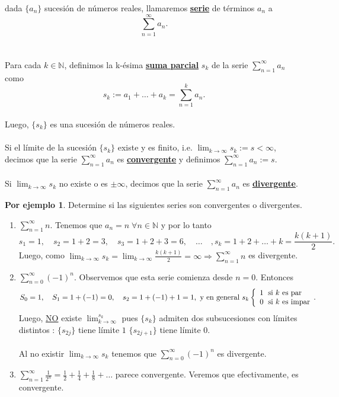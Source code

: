 \documentclass{article}
\theoremstyle{definition}
\theoremstyle{definition}
\newtheorem*{ej}{Por ejemplo}
\theoremstyle{remark}
\begin{document}
\begin{defi}
  dada $ \{ a_n \} $ sucesión de números reales, llamaremos \textbf{\underline{serie}} de términos $a_n$ a $$\sum_{n=1}^{\infty}{a_n}.$$ \\\\
 Para cada $k \in \mathbb{N}$, definimos la k-ésima \textbf{\underline{suma parcial}} $s_k$ de la serie $\sum_{n=1}^{\infty}{a_n}$ como $$s_k:=a_1 + \dots + a_k = \sum_{n=1}^{k}{a_n}.$$ \\
 Luego, $\{s_k\}$ es una sucesión de números reales.\\\\ Si el límite de la sucesión $\{s_k\}$ existe y es finito, i.e. $\lim_{k \to \infty}{s_k}:=s<\infty$, decimos que la serie $\sum_{n=1}^{\infty}{a_n}$ es \textbf{\underline{convergente}} y definimos $\sum_{n=1}^{\infty}{a_n}:=s$. \\\\
 Si $\lim_{k \to \infty}{s_k}$ no existe o es $\pm \infty$, decimos que la serie $\sum_{n=1}^{\infty}{a_n}$ es \textbf{\underline{divergente}}.


\end{defi}

\pagebreak
\begin{ej}
  Determine si las siguientes series son convergentes o divergentes. \\
  \begin{enumerate}
    \item $\sum_{n=1}^{\infty}{n}.$ \quad Tenemos que $a_n=n\; \forall n \in \mathbb{N}$ y por lo tanto \[ 
        s_1=1, \quad s_2=1+2=3, \quad s_3=1+2+3=6, \quad \dots \quad ,s_k=1+2+\dots + k= \frac{k(k+1)}{2} .
      \] 
      Luego, como $\lim_{k \to \infty}{s_k}=\lim_{k \to \infty}{\frac{k(k+1)}{2}}=\infty \Rightarrow \sum_{n=1}^{\infty}{n}$ es divergente.
    \item $\sum_{n=0}^{\infty}{(-1)^n}$. Observemos que esta serie comienza desde $n=0$. Entonces \[ 
        S_0=1, \quad S_1=1 + (-1) = 0, \quad s_2=1+(-1)+1=1, \text{ y en general } s_k \left\{ \begin{array}{l}
            1 \; $\text{ si $k$ es par}$  \\
0 \; $\text{ si $k$ es impar}$  
        \end{array}.\right.
      \]
      Luego, \underline{NO} existe $\lim_{k\to \infty}^{s_k}$ pues $\{s_k\}$ admiten dos subsucesiones con límites distintos : $\{s_{2j}\}$ tiene límite $1$ $\{s_{2j+1} \}$ tiene límite $0$.  \\\\ 
      Al no existir $\lim_{k \to \infty}{s_k}$ tenemos que $\sum_{n=0}^{\infty}{(-1)^n}$ es divergente.

    \item $\sum_{n=1}^{\infty}{\frac{1}{2^n}}=\frac{1}{2}+\frac{1}{4}+\frac{1}{8}+\dots $ parece convergente. Veremos que efectivamente, es convergente.
  \end{enumerate}
\end{ej}
\end{document}
